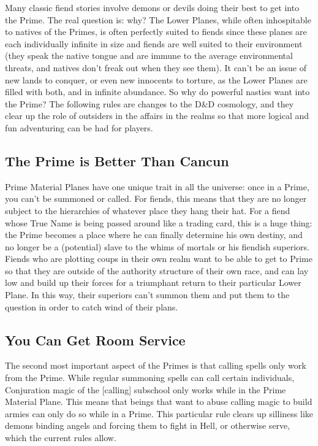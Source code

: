 Many classic fiend stories involve demons or devils doing their best to get into the Prime. The real question is: why? The Lower Planes, while often inhospitable to natives of the Primes, is often perfectly suited to fiends since these planes are each individually infinite in size and fiends are well suited to their environment (they speak the native tongue and are immune to the average environmental threats, and natives don't freak out when they see them). It can't be an issue of new lands to conquer, or even new innocents to torture, as the Lower Planes are filled with both, and in infinite abundance. So why do powerful nasties want into the Prime? The following rules are changes to the D\&D cosmology, and they clear up the role of outsiders in the affairs in the realms so that more logical and fun adventuring can be had for players.

\subsection{The Prime is Better Than Cancun}
Prime Material Planes have one unique trait in all the universe: once in a Prime, you can't be summoned or called. For fiends, this means that they are no longer subject to the hierarchies of whatever place they hang their hat. For a fiend whose True Name is being passed around like a trading card, this is a huge thing: the Prime becomes a place where he can finally determine his own destiny, and no longer be a (potential) slave to the whims of mortals or his fiendish superiors. Fiends who are plotting coups in their own realm want to be able to get to Prime so that they are outside of the authority structure of their own race, and can lay low and build up their forces for a triumphant return to their particular Lower Plane. In this way, their superiors can't summon them and put them to the question in order to catch wind of their plans.

\subsection{You Can Get Room Service}
The second most important aspect of the Primes is that calling spells only work from the Prime. While regular summoning spells can call certain individuals, Conjuration magic of the [calling] subschool only works while in the Prime Material Plane. This means that beings that want to abuse calling magic to build armies can only do so while in a Prime. This particular rule clears up silliness like demons binding angels and forcing them to fight in Hell, or otherwise serve, which the current rules allow.

